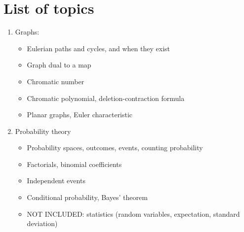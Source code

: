 \documentclass[12pt]{amsart}
\begin{document}
\section*{List of topics}

\begin{enumerate}

    \item Graphs:
        \begin{itemize}
            \item Eulerian paths and cycles, and when they exist
            \item Graph dual to a map
            \item Chromatic number
            \item Chromatic polynomial, deletion-contraction formula
            \item Planar graphs, Euler characteristic
        \end{itemize}

    \item Probability theory
        \begin{itemize}
            \item Probability spaces, outcomes, events, counting probability
            \item Factorials, binomial coefficients
            \item Independent events
            \item Conditional probability, Bayes' theorem
            \item  NOT INCLUDED: statistics (random variables, expectation, standard deviation)
        \end{itemize}

\end{enumerate}
\end{document}
